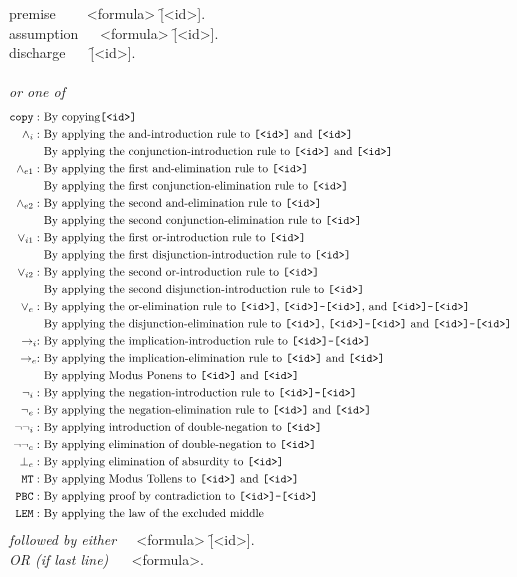 \documentclass[manual.tex]{subfiles}
\begin{document}
\newcommand{\id}{\f{[<id>]}}
\newcommand{\idd}{\f{\id -\id}}
{\ttfamily
\noindent
premise $~~~~~~~$\tra {} <formula>  \id. \\
assumption $~~~~$\tra {} <formula> \id.\\
discharge $~~~~~$\tra {} \id.\\~\\
\emph{or one of}
\vspace{-3mm}
\begin{align*}
\f{copy} :&\txt{ By copying} \id\\
\land_{i} :&\txt{ By applying the and-introduction rule to }\id\txt{ and }\id\\
&\txt{ By applying the conjunction-introduction rule to }\id\txt{ and }\id\\
\land_{e1} :&\txt{ By applying the first and-elimination rule to }\id\\
&\txt{ By applying the first conjunction-elimination rule to }\id\\
\land_{e2} :&\txt{ By applying the second and-elimination rule to }\id\\
&\txt{ By applying the second conjunction-elimination rule to }\id\\
\lor_{i1} :&\txt{ By applying the first or-introduction rule to }\id\\
&\txt{ By applying the first disjunction-introduction rule to }\id\\
\lor_{i2} :&\txt{ By applying the second or-introduction rule to }\id\\
&\txt{ By applying the second disjunction-introduction rule to }\id\\
\lor_e :&\txt{ By applying the or-elimination rule to }\id\txt{, }\idd\txt{, and }\idd\\
&\txt{ By applying the disjunction-elimination rule to }\id\txt{, }\idd\txt{ and }\idd\\
\ra_i  :&\txt{ By applying the implication-introduction rule to }\idd\\
\ra_e :&\txt{ By applying the implication-elimination rule to }\id\txt{ and }\id\\
&\txt{ By applying Modus Ponens to }\id\txt{ and }\id\\
\neg_i :&\txt{ By applying the negation-introduction rule to }\idd\\
\neg_e :&\txt{ By applying the negation-elimination rule to }\id\txt{ and }\id\\
\neg\neg_i :&\txt{ By applying introduction of double-negation to }\id\\
\neg\neg_e :&\txt{ By applying elimination of double-negation to }\id\\
\bot_e :&\txt{ By applying elimination of absurdity to }\id\\
\f{MT} :&\txt{ By applying Modus Tollens to }\id\txt{ and }\id\\
\f{PBC} :&\txt{ By applying proof by contradiction to }\idd\\
\f{LEM} :&\txt{ By applying the law of the excluded middle}
\end{align*}
\emph{followed by either}
$~~~~~$<formula> \id. \\
\emph{OR (if last line)} 
$~~~~~~$<formula>.
}
\end{document}
